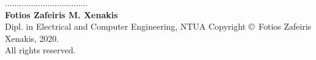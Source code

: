 \documentclass[12pt, a4paper, notitlepage]{report}
\newcommand{\blankpage}{\newpage\null\thispagestyle{empty}\newpage}
\begin{document}
\newpage
\vspace*{14ex}
\noindent
................................... \\
\textbf{Fotios Zafeiris M. Xenakis} \\
Dipl. in Electrical and Computer Engineering, NTUA
\vfill
\small
\noindent
Copyright \copyright\ Fotios Zafeiris Xenakis, 2020. \\
All rights reserved.

\thispagestyle{empty}

\newpage



\blankpage



\blankpage

\tableofcontents
{}

\listoffigures
{}

\listoftables
{}




% 
% 

\appendix




\end{document}

